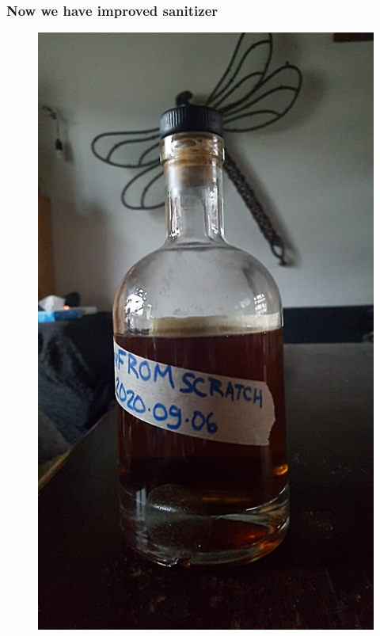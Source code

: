 \documentclass{beamer}
\begin{document}
\begin{frame}
\frametitle{Now we have improved sanitizer}
\begin{figure}
\includegraphics[height=.7\textheight]{images/aged-sanitizer.jpeg}
\end{figure}
\end{frame}
\end{document}
